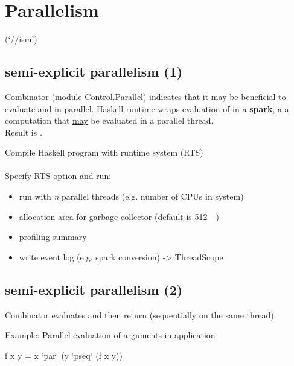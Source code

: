 


\chapter{Parallelism} %
\label{cha:parallelism}
(`//ism')


\section*{semi-explicit parallelism (1)}

Combinator  (module Control.Parallel) 
indicates that it may be beneficial to evaluate  and  in parallel. Haskell runtime wraps evaluation of  in a \textbf{spark}, a a computation that \underline{may} be evaluated in a parallel thread.\\
Result is . 



Compile Haskell program with runtime system (RTS)\\
\\
Specify RTS option and run:\\

\begin{itemize}
    \item {} run with \textit{n} parallel threads (e.g. number of CPUs in system)
    \item {} allocation area for garbage collector (default is \SI{512}{\kibi\byte})
    \item {} profiling summary
    \item {} write event log (e.g. spark conversion) -> ThreadScope
\end{itemize}



\section*{semi-explicit parallelism (2)}

Combinator  
evaluates  and then return  (sequentially on the same thread).

Example: Parallel evaluation of arguments in application\\
\begin{codebox}[haskell]
f x y = 
    x `par` (y `pseq` (f x y))
\end{codebox}









